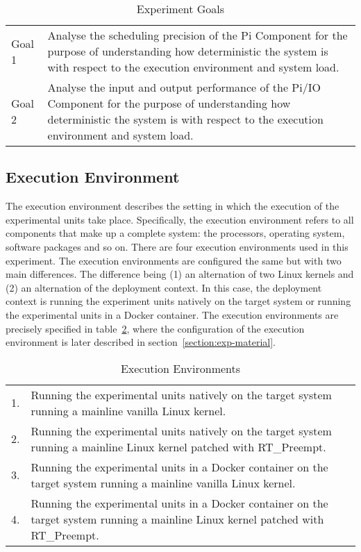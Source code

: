 \begin{table}[ht]
\begin{tabular}{l|p{12cm}}
Goal 1 & Analyse the scheduling precision of the Pi Component for the purpose of understanding how deterministic the system is with respect to the execution environment and system load. \\
Goal 2 & Analyse the input and output performance of the Pi/IO Component for the purpose of understanding how deterministic the system is with respect to the execution environment and system load.
\end{tabular}
\centering
\caption{Experiment Goals}
\label{table:exp-goals}
\end{table}


\subsection{Execution Environment} \label{section:exe-env}
The execution environment describes the setting in which the execution of the experimental units take place. Specifically, the execution environment refers to all components that make up a complete system: the processors, operating system, software packages and so on. There are four execution environments used in this experiment. The execution environments are configured the same but with two main differences. The difference being (1) an alternation of two Linux kernels and (2) an alternation of the deployment context. In this case, the deployment context is running the experiment units natively on the target system or running the experimental units in a Docker container. The execution environments are precisely specified in table~\ref{table:exe-env}, where the configuration of the execution environment is later described in section~\ref{section:exp-material}.


\begin{table}[ht]
\begin{tabular}{l|p{14cm}}
1. & Running the experimental units natively on the target system running a mainline vanilla Linux kernel.                               \\
2. & Running the experimental units natively on the target system running a mainline Linux kernel patched with RT\_Preempt.              \\
3. & Running the experimental units in a Docker container on the target system running a mainline vanilla Linux kernel.                  \\
4. & Running the experimental units in a Docker container on the target system running a mainline Linux kernel patched with RT\_Preempt.
\end{tabular}
\centering
\caption{Execution Environments}
\label{table:exe-env}
\end{table}


